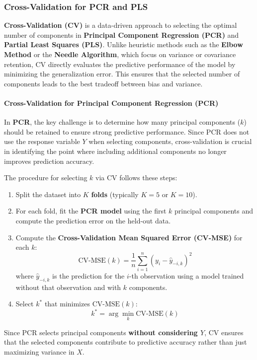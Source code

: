 \documentclass[11pt,twoside,a4paper]{article}
\begin{document}
\subsubsection{Cross-Validation for PCR and PLS}
\textbf{Cross-Validation (CV)} is a data-driven approach to selecting the optimal number of components in \textbf{Principal Component Regression (PCR)} and \textbf{Partial Least Squares (PLS)}. Unlike heuristic methods such as the \textbf{Elbow Method} or the \textbf{Needle Algorithm}, which focus on variance or covariance retention, CV directly evaluates the predictive performance of the model by minimizing the generalization error. This ensures that the selected number of components leads to the best tradeoff between bias and variance.

\paragraph{Cross-Validation for Principal Component Regression (PCR)}
In \textbf{PCR}, the key challenge is to determine how many principal components (\( k \)) should be retained to ensure strong predictive performance. Since PCR does not use the response variable \( Y \) when selecting components, cross-validation is crucial in identifying the point where including additional components no longer improves prediction accuracy.

The procedure for selecting \( k \) via CV follows these steps:
\begin{enumerate}
    \item Split the dataset into \( K \) \textbf{folds} (typically \( K = 5 \) or \( K = 10 \)).
    \item For each fold, fit the \textbf{PCR model} using the first \( k \) principal components and compute the prediction error on the held-out data.
    \item Compute the \textbf{Cross-Validation Mean Squared Error (CV-MSE)} for each \( k \):
    \[
    \text{CV-MSE}(k) = \frac{1}{n} \sum_{i=1}^{n} (y_i - \hat{y}_{-i,k})^2
    \]
    where \( \hat{y}_{-i,k} \) is the prediction for the \( i \)-th observation using a model trained without that observation and with \( k \) components.
    \item Select \( k^* \) that minimizes \(\text{CV-MSE}(k)\):
    \[
    k^* = \arg\min_k \text{CV-MSE}(k)
    \]
\end{enumerate}

Since PCR selects principal components \textbf{without considering \( Y \)}, CV ensures that the selected components contribute to predictive accuracy rather than just maximizing variance in \( X \).
\end{document}
